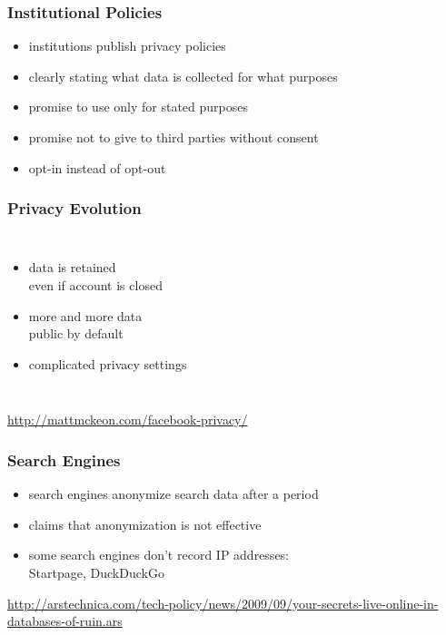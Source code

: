 \documentclass[dvipsnames]{beamer}
\theoremstyle{plain}
\begin{document}
\begin{frame}
  \frametitle{Institutional Policies}

  \begin{itemize}
    \item institutions publish privacy policies
    \item clearly stating what data is collected for what purposes
    \item promise to use only for stated purposes
    \item promise not to give to third parties without consent

    \medskip
    \item opt-in instead of opt-out
  \end{itemize}
\end{frame}

\begin{frame}
  \frametitle{Privacy Evolution}

  \begin{columns}

    \begin{itemize}
      \item data is retained\\
        even if account is closed
      \item more and more data\\
        public by default
      \item complicated privacy settings
    \end{itemize}
  \end{columns}

  \medskip
  \tiny{\url{http://mattmckeon.com/facebook-privacy/}}\\
\end{frame}

\begin{frame}
  \frametitle{Search Engines}

  \begin{itemize}
    \item search engines anonymize search data after a period
    \item claims that anonymization is not effective

    \medskip
    \item some search engines don't record IP addresses:\\
      Startpage, DuckDuckGo
  \end{itemize}

  \medskip
  \tiny{\url{http://arstechnica.com/tech-policy/news/2009/09/your-secrets-live-online-in-databases-of-ruin.ars}}\\
\end{frame}
\end{document}
